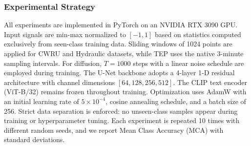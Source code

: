 \subsubsection{Experimental Strategy}
All experiments are implemented in PyTorch on an NVIDIA RTX 3090 GPU. Input signals are min-max normalized to $[-1, 1]$ based on statistics computed exclusively from seen-class training data. Sliding windows of 1024 points are applied for CWRU and Hydraulic datasets, while TEP uses the native 3-minute sampling intervals. For diffusion, $T=1000$ steps with a linear noise schedule are employed during training. The U-Net backbone adopts a 4-layer 1-D residual architecture with channel dimensions $[64, 128, 256, 512]$. The CLIP text encoder (ViT-B/32) remains frozen throughout training. Optimization uses AdamW with an initial learning rate of $5 \times 10^{-4}$, cosine annealing schedule, and a batch size of 256. Strict data separation is enforced: no unseen-class samples appear during training or hyperparameter tuning. Each experiment is repeated 10 times with different random seeds, and we report Mean Class Accuracy (MCA) with standard deviations.
